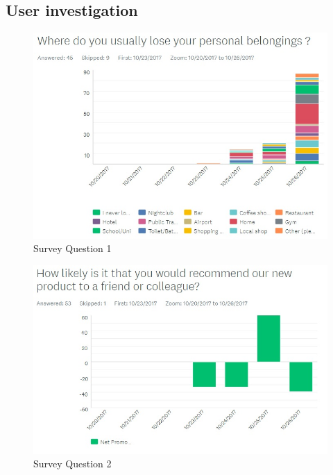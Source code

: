 \documentclass[12pt,a4paper]{article}
\begin{document}
    
    \begin{appendices}      

      \section{User investigation}
      \label{appendix:user-investigation}
      
        \begin{figure}[H]
          \centering
          \includegraphics[width=1\textwidth]{../assets/12-2-survey-1.jpg}
          \caption{Survey Question 1}
          \label{fig:Survey Question 1}
        \end{figure}
      
        \begin{figure}[H]
          \centering
          \includegraphics[width=1\textwidth]{../assets/12-2-survey-2.jpg}
          \caption{Survey Question 2}
          \label{fig:Survey Question 2}
        \end{figure}


\end{appendices}
\end{document}
